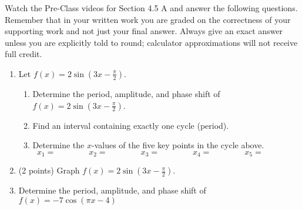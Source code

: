 


\noindent Watch the Pre-Class videos for Section 4.5 A and answer the following questions. Remember that in your written work you are graded on the correctness of your supporting work and not just your final answer. Always give an exact answer unless you are explicitly told to round; calculator approximations will not receive full credit. 


\begin{enumerate}
\item Let $f(x)=2\sin(3x-\frac{\pi}{2})$.

\begin{enumerate}

\item  Determine the period, amplitude, and phase shift of $f(x)=2\sin(3x-\frac{\pi}{2})$.\vfill
\item Find an interval containing exactly one cycle (period).\vfill
\item  Determine the $x$-values of the five key points in the cycle above.
$$x_1= \quad \quad \quad \quad x_2= \quad \quad \quad \quad x_3= \quad \quad \quad \quad x_4= \quad \quad \quad \quad x_5= \quad \quad \quad \quad$$
\vfill

\end{enumerate}
\newpage


\item (2 points) Graph $f(x)=2\sin(3x-\frac{\pi}{2})$.








\item  Determine the period, amplitude, and phase shift of $f(x)=-7\cos(\pi x -4)$\vfill





\end{enumerate}



